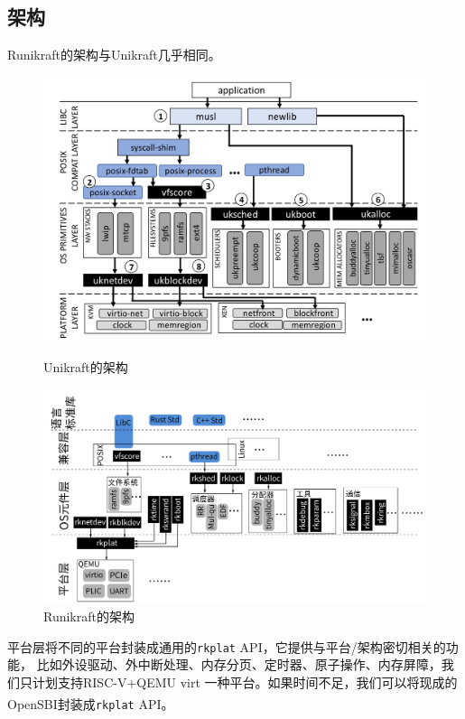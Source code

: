 \documentclass[UTF8,fontset=none,linespread=1.15]{ctexart}
\let\nosupcite\cite
\renewcommand*{\cite}[1]{\textsuperscript{\nosupcite{#1}}}
\begin{document}
\subsection{架构}
Runikraft的架构与Unikraft几乎相同。
\begin{figure}[!hbt]
\centering
\begin{minipage}{0.49\linewidth}
\centering
\includegraphics[width=\linewidth]{assets/Unikraft-architecture.png}
\caption{Unikraft的架构}\label{fig:unikraft-arch}
\end{minipage}
\begin{minipage}{0.49\linewidth}
\centering
\includegraphics[width=\linewidth]{assets/Runikraft-architecture.pdf}
\caption{Runikraft的架构}\label{fig:runikraft-arch}
\end{minipage}
\end{figure}
平台层将不同的平台封装成通用的\texttt{rkplat} API，它提供与平台/架构密切相关的功能，
比如外设驱动、外中断处理、内存分页、定时器、原子操作、内存屏障，我们只计划支持RISC-V+QEMU virt
一种平台。如果时间不足，我们可以将现成的OpenSBI\cite{5}\cite{6}封装成\texttt{rkplat} API。
\end{document}
